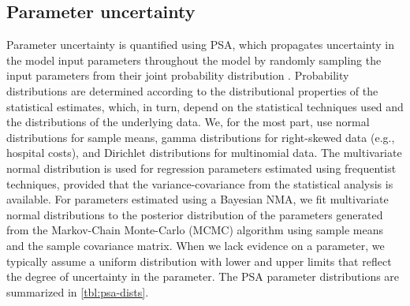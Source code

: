 \documentclass[11pt,final,fleqn]{article}\usepackage[]{graphicx}\usepackage[]{color}
\theoremstyle{plain}
\begin{document}
\subsection{Parameter uncertainty}\label{parameter-uncertainty}
Parameter uncertainty is quantified using PSA, which propagates uncertainty in the model input parameters throughout the model by randomly sampling the input parameters from their joint probability distribution \citep{baio2015probabilistic, claxton2005probabilistic}. Probability distributions are determined according to the distributional properties of the statistical estimates, which, in turn, depend on the statistical techniques used and the distributions of the underlying data. We, for the most part, use normal distributions for sample means, gamma distributions for right-skewed data (e.g., hospital costs), and Dirichlet distributions for multinomial data. The multivariate normal distribution is used for regression parameters estimated using frequentist techniques, provided that the variance-covariance from the statistical analysis is available. For parameters estimated using a Bayesian NMA, we fit multivariate normal distributions to the posterior distribution of the parameters generated from the Markov-Chain Monte-Carlo (MCMC) algorithm using sample means and the sample covariance matrix. When we lack evidence on a parameter, we typically assume a uniform distribution with lower and upper limits that reflect the degree of uncertainty in the parameter. The PSA parameter distributions are summarized in \autoref{tbl:psa-dists}. 
\end{document}
